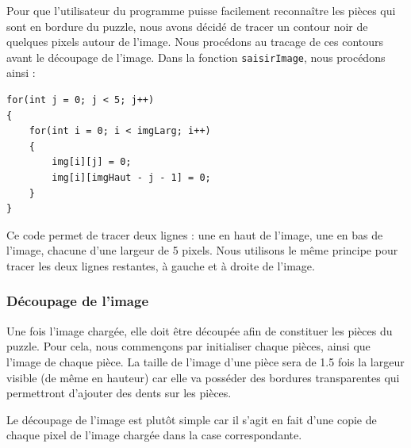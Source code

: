 \documentclass[]{article}
\newcommand{\variable}[1]{\noindent \texttt{#1}}
\begin{document}
Pour que l'utilisateur du programme puisse facilement reconnaître les pièces qui sont en bordure du puzzle, nous avons décidé de tracer un contour noir de quelques pixels autour de l'image. Nous procédons au tracage de ces contours avant le découpage de l'image. Dans la fonction \variable{saisirImage}, nous procédons ainsi :

\begin{lstlisting}
for(int j = 0; j < 5; j++)
{
    for(int i = 0; i < imgLarg; i++)
    {
        img[i][j] = 0;
        img[i][imgHaut - j - 1] = 0;
    }
}
\end{lstlisting}

Ce code permet de tracer deux lignes : une en haut de l'image, une en bas de l'image, chacune d'une largeur de 5 pixels. Nous utilisons le même principe pour tracer les deux lignes restantes, à gauche et à droite de l'image.

\subsubsection{Découpage de l'image}

Une fois l'image chargée, elle doit être découpée afin de constituer les pièces du puzzle. Pour cela, nous commençons par initialiser chaque pièces, ainsi que l'image de chaque pièce. La taille de l'image d'une pièce sera de 1.5 fois la largeur visible (de même en hauteur) car elle va posséder des bordures transparentes qui permettront d'ajouter des dents sur les pièces.

Le découpage de l'image est plutôt simple car il s'agit en fait d'une copie de chaque pixel de l'image chargée dans la case correspondante.
\end{document}
